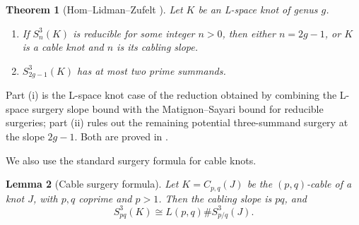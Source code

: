 \documentclass[12pt]{article}
\newtheorem{theorem}{Theorem}
\newtheorem{lemma}[theorem]{Lemma}
\theoremstyle{definition}
\begin{document}
\begin{theorem}[Hom--Lidman--Zufelt \cite{HLZ}]
\label{thm:HLZ-dichotomy}
Let \(K\) be an L-space knot of genus \(g\).
\begin{enumerate}
\item[(i)] If \(S^3_n(K)\) is reducible for some integer \(n>0\), then either
\(n=2g-1\), or \(K\) is a cable knot and \(n\) is its cabling slope.
\item[(ii)] \(S^3_{2g-1}(K)\) has at most two prime summands.
\end{enumerate}
\end{theorem}

Part (i) is the L-space knot case of the reduction obtained by combining the
L-space surgery slope bound with the Matignon--Sayari bound for reducible
surgeries; part (ii) rules out the remaining potential three-summand surgery at
the slope \(2g-1\).  Both are proved in \cite{HLZ}.

We also use the standard surgery formula for cable knots.

\begin{lemma}[Cable surgery formula]
\label{lem:cable}
Let \(K=C_{p,q}(J)\) be the \((p,q)\)-cable of a knot \(J\), with \(p,q\)
coprime and \(p>1\).  Then the cabling slope is \(pq\), and
\[
S^3_{pq}(K)\cong L(p,q)\# S^3_{p/q}(J).
\]
\end{lemma}
\end{document}
